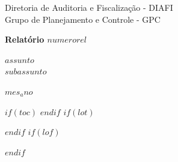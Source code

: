 \documentclass[$if(fontsize)$$fontsize$,$endif$$if(lang)$$lang$,$endif$$if(papersize)$$papersize$,$endif$$for(classoption)$$classoption$$sep$,$endfor$]{$documentclass$}
\begin{document}

\thispagestyle{primeirapag}




\begin{center}
	{\large Diretoria de Auditoria e Fiscalização - DIAFI} \\
	{\large Grupo de Planejamento e Controle - GPC} \\
\end{center}


\vspace{5cm}

\begin{center}
{\Large \textbf{Relatório $numerorel$}}

\end{center}


\vspace{1cm}

\begin{center}
	{\Huge \textbf{$assunto$}} \\
	\vspace{0.5cm}
	{\Large $subassunto$}
\end{center}

\vspace{11cm}

\begin{center}
	$mes_ano$
\end{center}



\newpage

\restoregeometry

\thispagestyle{empty}



$if(toc)$
{
\hypersetup{linkcolor=black}
\setcounter{tocdepth}{$toc-depth$}
\tableofcontents
}
$endif$
$if(lot)${
\hypersetup{linkcolor=black}
\listoftables
}
$endif$
$if(lof)$
\hypersetup{linkcolor=black}
\listoffigures
$endif$
\end{document}
